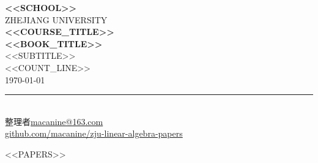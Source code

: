 \documentclass[UTF8,a4paper,11pt]{ctexart}
\begin{document}
\begin{titlepage}
\centering
\vspace*{0.6cm}
{\bfseries{} <<SCHOOL>>}\\[0.8em]
{\large{} ZHEJIANG UNIVERSITY}\\[2.8em]
{\Huge\bfseries <<COURSE_TITLE>>}\\[0.9em]
{\Huge\bfseries <<BOOK_TITLE>>}\\[2.6em]
{\LARGE <<SUBTITLE>>}\\[1.5em]
{\large <<COUNT_LINE>>}\\[2.2em]
{\large \today}
\vfill
{\small
  \rule{0.3\linewidth}{0.4pt}\\[0.9em]
  整理者\quad \href{mailto:macanine@163.com}{macanine@163.com}\\[0.35em]
  \href{https://github.com/macanine/zju-linear-algebra-papers}{github.com/macanine/zju-linear-algebra-papers}
}
\end{titlepage}

{}
\tableofcontents

\clearpage
{}
\setcounter{page}{1}

<<PAPERS>>
\end{document}
